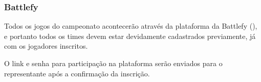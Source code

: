 \subsubsection{Battlefy}

Todos os jogos do campeonato acontecerão através da plataforma da Battlefy (), e portanto todos os times devem estar devidamente cadastrados previamente, já com os jogadores inscritos.

O link e senha para participação na plataforma serão enviados para o representante após a confirmação da inscrição.
